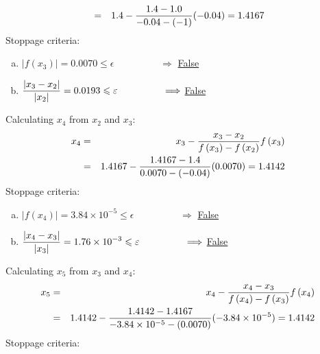 \begin{list}{\bf Example :~}{}
\begin{description}
\begin{list}{{\bf Iteration } (k=):~}{}
\begin{eqnarray}
                           &=& 1.4 - \displaystyle\frac{1.4 - 1.0}{-0.04-(-1)}  (-0.04) = 1.4167
                  \end{eqnarray}
                  Stoppage criteria:
                    \begin{enumerate}[(a)]
                         \item $\left|f\left(x_{3}\right)\right| = 0.0070 \leq \epsilon \hspace{2cm} \Longrightarrow$ \underline{False}
                         \item $\displaystyle\frac{\left|x_{3}-x_{2}\right|}{\left|x_{2}\right|} = 0.0193 \leqslant \varepsilon \hspace{1.65cm} \Longrightarrow$ \underline{False}
                    \end{enumerate}
            \item Calculating $x_{4}$ from $x_{2}$ and $x_{3}$:
                  \begin{eqnarray}
                      x_{4} &=& x_{3} - \displaystyle\frac{ x_{3} - x_{2} }{f\left(x_{3}\right) - f\left(x_{2}\right)} f\left(x_{3}\right) \nonumber \\
                           &=& 1.4167 - \displaystyle\frac{1.4167 - 1.4}{0.0070-(-0.04)}  (0.0070) = 1.4142
                  \end{eqnarray}
                  Stoppage criteria:
                    \begin{enumerate}[(a)]
                         \item $\left|f\left(x_{4}\right)\right| = 3.84\times 10^{-5} \leq \epsilon \hspace{2cm} \Longrightarrow$ \underline{False}
                         \item $\displaystyle\frac{\left|x_{4}-x_{3}\right|}{\left|x_{3}\right|} = 1.76\times 10^{-3} \leqslant \varepsilon \hspace{1.65cm} \Longrightarrow$ \underline{False}
                    \end{enumerate}
            \item Calculating $x_{5}$ from $x_{3}$ and $x_{4}$:
                  \begin{eqnarray}
                      x_{5} &=& x_{4} - \displaystyle\frac{ x_{4} - x_{3} }{f\left(x_{4}\right) - f\left(x_{3}\right)} f\left(x_{4}\right) \nonumber \\
                           &=& 1.4142 - \displaystyle\frac{1.4142 - 1.4167}{-3.84\times 10^{-5}-(0.0070)}  (-3.84\times 10^{-5}) = 1.4142
                  \end{eqnarray}
                  Stoppage criteria:
                    \begin{enumerate}[(a)]

\end{enumerate}
\end{list}
\end{description}
\end{list}
